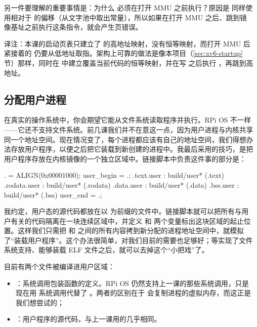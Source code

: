 另一件要理解的重要事情是：为什么  必须在打开 MMU 之前执行？原因是  同样使用相对于  的偏移（从文字池中取出常量），所以如果在打开 MMU 之后、跳到镜像基址之前执行这条指令，就会产生页错误。

\begin{remark}
  译注：本课的启动页表只建立了  的高地址映射，没有恒等映射，而打开 MMU 后紧接着的  仍要从低地址取指。架构上可靠的做法是像本项目（\ref{sec:xv6-startup} 节）那样，同时在  中建立覆盖当前代码的恒等映射，并在写  之后执行 ，再跳到高地址。
\end{remark}

\subsection{分配用户进程}

在真实的操作系统中，你会期望它能从文件系统读取程序并执行。RPi OS 不一样——它还不支持文件系统。前几课我们并不在意这一点，因为用户进程与内核共享同一个地址空间。现在情况变了，每个进程都应该有自己的地址空间，我们得想办法存放用户程序，以便之后把它装载到新创建的进程中。我最后采用的技巧，是把用户程序存放在内核镜像的一个独立区域中。链接脚本中负责这件事的部分是：

\begin{txtcode}
	. = ALIGN(0x00001000);
	user_begin = .;
	.text.user : { build/user* (.text) }
	.rodata.user : { build/user* (.rodata) }
	.data.user : { build/user* (.data) }
	.bss.user : { build/user* (.bss) }
	user_end = .;
\end{txtcode}

我约定，用户态的源代码都放在以  为前缀的文件中。链接脚本就可以把所有与用户有关的代码隔离在一块连续区域中，并定义  和  两个变量标出这块区域的起止位置。这样我们只需把  和  之间的所有内容拷到新分配的进程地址空间中，就模拟了“装载用户程序”。这个办法很简单，对我们目前的需要也足够好；等实现了文件系统支持、能够装载 ELF 文件之后，就可以去掉这个“小把戏”了。

目前有两个文件被编译进用户区域：

\begin{itemize}
  \item {}：系统调用包装函数的定义。RPi OS 仍然支持上一课的那些系统调用，只是现在用  系统调用代替了 。两者的区别在于  会复制进程的虚拟内存，而这正是我们想尝试的；
  \item {}：用户程序的源代码，与上一课用的几乎相同。
\end{itemize}

